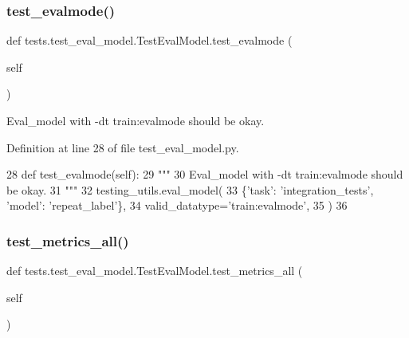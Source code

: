 \subsubsection{\texorpdfstring{test\+\_\+evalmode()}{test\_evalmode()}}
{\footnotesize\ttfamily def tests.\+test\+\_\+eval\+\_\+model.\+Test\+Eval\+Model.\+test\+\_\+evalmode (\begin{DoxyParamCaption}\item[{}]{self }\end{DoxyParamCaption})}

\begin{DoxyVerb}Eval_model with -dt train:evalmode should be okay.
\end{DoxyVerb}
 

Definition at line 28 of file test\+\_\+eval\+\_\+model.\+py.


\begin{DoxyCode}
28     \textcolor{keyword}{def }test\_evalmode(self):
29         \textcolor{stringliteral}{"""}
30 \textcolor{stringliteral}{        Eval\_model with -dt train:evalmode should be okay.}
31 \textcolor{stringliteral}{        """}
32         testing\_utils.eval\_model(
33             \{\textcolor{stringliteral}{'task'}: \textcolor{stringliteral}{'integration\_tests'}, \textcolor{stringliteral}{'model'}: \textcolor{stringliteral}{'repeat\_label'}\},
34             valid\_datatype=\textcolor{stringliteral}{'train:evalmode'},
35         )
36 
\end{DoxyCode}
\mbox{\label{classtests_1_1test__eval__model_1_1TestEvalModel_a35d01001a5c2f289c98b384e1a53e515}} 
\subsubsection{\texorpdfstring{test\+\_\+metrics\+\_\+all()}{test\_metrics\_all()}}
{\footnotesize\ttfamily def tests.\+test\+\_\+eval\+\_\+model.\+Test\+Eval\+Model.\+test\+\_\+metrics\+\_\+all (\begin{DoxyParamCaption}\item[{}]{self }\end{DoxyParamCaption})}

